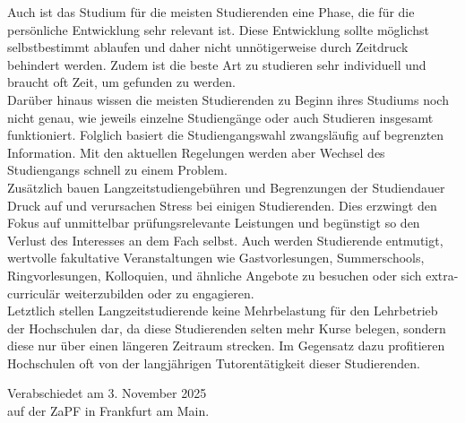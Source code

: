 \documentclass[DIV=calc]{scrartcl}
\begin{document}
Auch ist das Studium für die meisten Studierenden eine Phase, die für die persönliche Entwicklung sehr relevant ist. Diese Entwicklung sollte möglichst selbstbestimmt ablaufen und daher nicht unnötigerweise durch Zeitdruck behindert werden. Zudem ist die beste Art zu studieren sehr individuell und braucht oft Zeit, um gefunden zu werden.\\
Darüber hinaus wissen die meisten Studierenden zu Beginn ihres Studiums noch nicht genau, wie jeweils einzelne Studiengänge oder auch Studieren insgesamt funktioniert. Folglich basiert die Studiengangswahl
 zwangsläufig auf begrenzten Information. Mit den aktuellen Regelungen werden aber Wechsel des Studiengangs schnell zu einem Problem.\\
 Zusätzlich bauen Langzeitstudiengebühren und Begrenzungen der Studiendauer Druck auf und verursachen Stress bei einigen Studierenden. Dies erzwingt den Fokus auf unmittelbar prüfungsrelevante
 Leistungen und begünstigt so den Verlust des Interesses an dem Fach selbst. Auch werden Studierende entmutigt, wertvolle fakultative Veranstaltungen wie Gastvorlesungen, Summerschools, Ringvorlesungen, Kolloquien, und ähnliche Angebote zu besuchen oder sich extra-curriculär weiterzubilden oder zu engagieren.\\
 Letztlich stellen Langzeitstudierende keine Mehrbelastung für den Lehrbetrieb der Hochschulen dar, da diese Studierenden selten mehr Kurse belegen, sondern diese nur über einen längeren Zeitraum strecken. Im Gegensatz dazu profitieren Hochschulen oft von der langjährigen Tutorentätigkeit dieser Studierenden.


%
\vfill
\begin{flushright}
	Verabschiedet am 3. November 2025 \\
	auf der ZaPF in Frankfurt am Main.
\end{flushright}
\end{document}
